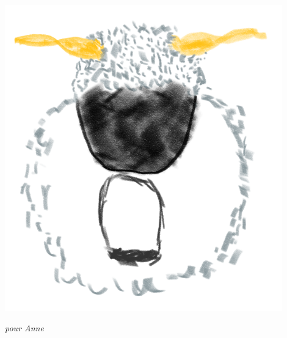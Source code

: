 \thispagestyle{empty}
\cleardoublepage
\thispagestyle{empty}

\null{}
\hfill%
\begin{center}
\includegraphics[width=0.9\textwidth]{0_cover/maeh.png}
\end{center}
\vspace{2cm}
\begin{center}
\textit{pour Anne}
\end{center}

\clearpage{ \thispagestyle{empty} \cleardoublepage}
